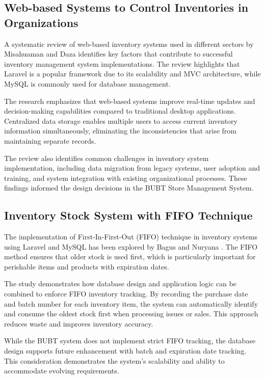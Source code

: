 \subsection{Web-based Systems to Control Inventories in Organizations}

A systematic review of web-based inventory systems used in different sectors by Misahuaman and Daza \cite{web_inventory_systems} identifies key factors that contribute to successful inventory management system implementations. The review highlights that Laravel is a popular framework due to its scalability and MVC architecture, while MySQL is commonly used for database management.

The research emphasizes that web-based systems improve real-time updates and decision-making capabilities compared to traditional desktop applications. Centralized data storage enables multiple users to access current inventory information simultaneously, eliminating the inconsistencies that arise from maintaining separate records.

The review also identifies common challenges in inventory system implementation, including data migration from legacy systems, user adoption and training, and system integration with existing organizational processes. These findings informed the design decisions in the BUBT Store Management System.

\subsection{Inventory Stock System with FIFO Technique}

The implementation of First-In-First-Out (FIFO) technique in inventory systems using Laravel and MySQL has been explored by Bagus and Nuryana \cite{fifo_inventory}. The FIFO method ensures that older stock is used first, which is particularly important for perishable items and products with expiration dates.

The study demonstrates how database design and application logic can be combined to enforce FIFO inventory tracking. By recording the purchase date and batch number for each inventory item, the system can automatically identify and consume the oldest stock first when processing issues or sales. This approach reduces waste and improves inventory accuracy.

While the BUBT system does not implement strict FIFO tracking, the database design supports future enhancement with batch and expiration date tracking. This consideration demonstrates the system's scalability and ability to accommodate evolving requirements.

